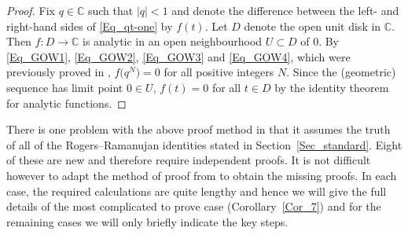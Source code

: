 \documentclass[pdftex]{sigma}
\numberwithin{equation}{section}
\renewcommand{\geq}{\geqslant}
\newcommand{\abs}[1]{\vert#1\vert}
\begin{document}
\begin{proof}
Fix $q\in\mathbb{C}$ such that $\abs{q}<1$ and denote the difference
between the left- and right-hand sides of \eqref{Eq_qt-one} by
$f(t)$.
Let $D$ denote the open unit disk in $\mathbb{C}$.
Then $f\colon D\to\mathbb{C}$ is analytic in an open neighbourhood $U\subset D$
of $0$.
By \eqref{Eq_GOW1}, \eqref{Eq_GOW2}, \eqref{Eq_GOW3} and \eqref{Eq_GOW4},
which were previously proved in \cite[Theorems~1.1--1.3]{GOW16},
$f\bigl(q^N\bigr)=0$ for all positive integers $N$.
Since the (geometric) sequence \smash{$\bigl(q^N\bigr)_{N\geq 1}$} has limit point $0\in U$,
$f(t)=0$ for all $t\in D$ by the identity theorem for analytic functions.
\end{proof}

There is one problem with the above proof method in that it assumes the
truth of all of the Rogers--Ramanujan identities stated in
Section~\ref{Sec_standard}.
Eight of these are new and therefore require independent proofs.
It is not difficult however to adapt the method of proof from
\cite{GOW16,RW21} to obtain the missing proofs.
In each case, the required calculations are quite lengthy and hence
we will give the full details of the most complicated to prove case
(Corollary~\ref{Cor_7}) and for the remaining cases we will only
briefly indicate the key steps.
\end{document}
